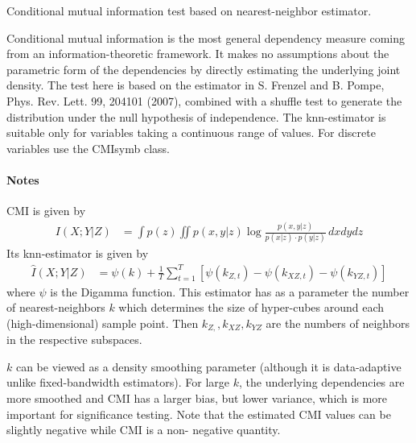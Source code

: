 \documentclass[letterpaper,10pt,english]{sphinxmanual}
\begin{document}
\begin{fulllineitems}
\label{\detokenize{index:tigramite.independence_tests.CMIknn}}
Conditional mutual information test based on nearest-neighbor estimator.

Conditional mutual information is the most general dependency measure
coming from an information-theoretic framework. It makes no assumptions
about the parametric form of the dependencies by directly estimating the
underlying joint density. The test here is based on the estimator in  S.
Frenzel and B. Pompe, Phys. Rev. Lett. 99, 204101 (2007), combined with a
shuffle test to generate  the distribution under the null hypothesis of
independence. The knn-estimator is suitable only for variables taking a
continuous range of values. For discrete variables use the CMIsymb class.
\paragraph{Notes}

CMI is given by
\begin{equation*}
\begin{split}I(X;Y|Z) &= \int p(z)  \iint  p(x,y|z) \log
\frac{ p(x,y |z)}{p(x|z)\cdot p(y |z)} \,dx dy dz\end{split}
\end{equation*}
Its knn-estimator is given by
\begin{equation*}
\begin{split}\widehat{I}(X;Y|Z)  &=   \psi (k) + \frac{1}{T} \sum_{t=1}^T
\left[ \psi(k_{Z,t}) - \psi(k_{XZ,t}) - \psi(k_{YZ,t}) \right]\end{split}
\end{equation*}
where \(\psi\) is the Digamma function.  This estimator has as a
parameter the number of nearest-neighbors \(k\) which determines the
size of hyper-cubes around each (high-dimensional) sample point. Then
\(k_{Z,},k_{XZ},k_{YZ}\) are the numbers of neighbors in the respective
subspaces.

\(k\) can be viewed as a density smoothing parameter (although it is
data-adaptive unlike fixed-bandwidth estimators). For large \(k\), the
underlying dependencies are more smoothed and CMI has a larger bias,
but lower variance, which is more important for significance testing. Note
that the estimated CMI values can be slightly negative while CMI is a non-
negative quantity.


\end{fulllineitems}
\end{document}

